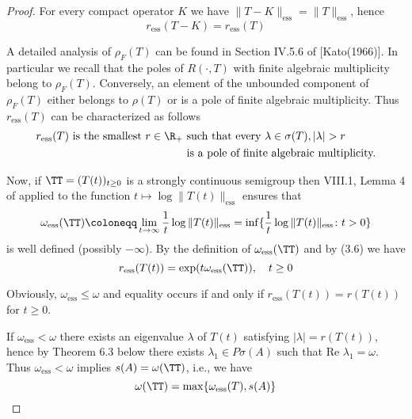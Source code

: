 \begin{proof}
For every compact operator $K$ we have $\|T - K\|_{\text{ess}} = \|T\|_{\text{ess}}$, hence
\begin{equation}\label{eq:a3-3.7}
r_{\text{ess}}(T - K) = r_{\text{ess}}(T)
\end{equation}


\newpage
A detailed analysis of $\rho_{F}(T)$ can be found in Section IV.5.6 of [Kato(1966)].
In particular we recall that the poles of $R(\cdot,T)$ with finite algebraic multiplicity belong to $\rho_{F}(T)$.
Conversely, an element of the unbounded component of $\rho_{F}(T)$ either belongs to $\rho(T)$ or is a pole of finite algebraic multiplicity.
Thus $r_{\text{ess}}(T)$ can be characterized as follows
\begin{equation}\label{eq:a3-3.8}
\begin{split}
r_{\text{ess}}(T) \text{ is the smallest } r \in \R_{+} 
& \text{ such that every } \lambda \in \sigma(T), |\lambda| > r \\
& \text{ is a pole of finite algebraic multiplicity.}
\end{split}
\end{equation}

Now, if $\TT = (T(t))_{t \geq 0}$ is a strongly continuous semigroup then VIII.1, Lemma 4 of \citet{dunfordschwartz:1958} applied to the function $t \mapsto \log \|T(t)\|_{\text{ess}}$ ensures that
\begin{equation}\label{eq:a3-3.9}
\omega_{\text{ess}}(\TT) \coloneqq \lim_{t \to \infty} \frac{1}{t} \log\|T(t)\|_{\text{ess}} = \inf \{\frac{1}{t} \log\|T(t)\|_{\text{ess}} \colon t > 0\}
\end{equation}
is well defined (possibly $-\infty$).
By the definition of $\omega_{\text{ess}}(\TT)$ and by (3.6) we have
\begin{equation}\label{eq:a3-3.10}
r_{\text{ess}}(T(t)) = \exp(t\omega_{\text{ess}}(\TT)), \quad t \geq 0
\end{equation}

Obviously, $\omega_{\text{ess}} \leq \omega$ and equality occurs if and only if $r_{\text{ess}}(T(t)) = r(T(t))$ for $t \geq 0$.

If $\omega_{\text{ess}} < \omega$ there exists an eigenvalue $\lambda$ of $T(t)$ satisfying $|\lambda| = r(T(t))$, hence by Theorem 6.3 below there exists $\lambda_{1} \in P\sigma(A)$ such that $\text{Re }\lambda_{1} = \omega$.
Thus $\omega_{\text{ess}} < \omega$ implies $s(A) = \omega(\TT)$, i.e., we have
\begin{equation}\label{eq:a3-3.11}
\omega(\TT) = \max\{\omega_{\text{ess}}(T),s(A)\}
\end{equation}


\end{proof}
